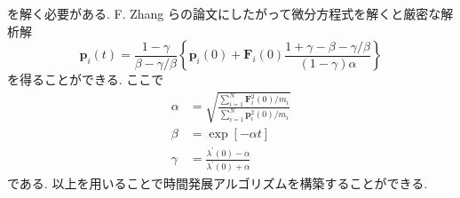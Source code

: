 を解く必要がある. 
F. Zhang \cite{Zhang1997}らの論文にしたがって微分方程式を解くと厳密な解析解
\begin{equation}
    \bm{p}_{i}(t)
    =
    \frac{1 - \gamma}{\beta - \gamma / \beta}
    \left\{
        \bm{p}_{i}(0) + \bm{F}_{i}(0)
        \frac{1 + \gamma - \beta - \gamma/\beta}{(1 - \gamma)\alpha}
    \right\}
\end{equation}
を得ることができる. ここで
\begin{align}
    \alpha &=
    \sqrt
    {
        \frac
        {\sum_{i=1}^{N} \bm{F}_{i}^{2}(0) / m_{i}}
        {\sum_{i=1}^{N} \bm{p}_{i}^{2}(0) / m_{i}}
    }
    \\
    \beta &=
    \exp[-\alpha t]
    \\
    \gamma &=
    \frac{\lambda^{\prime}(0) - \alpha}{\lambda^{\prime}(0) + \alpha}
\end{align}
である. 以上を用いることで時間発展アルゴリズムを構築することができる.






